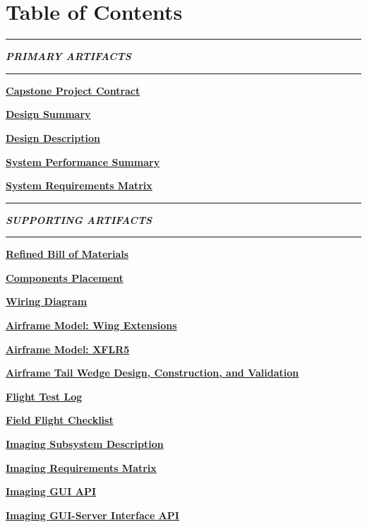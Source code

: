 \documentclass[]{article}
\newcommand{\pdflink}[2]{
\hyperlink{#1.1}{\textbf{#2}}
}
\begin{document}



\section*{Table of Contents}

\hrule

\textbf{\textit{PRIMARY ARTIFACTS}}

\hrule

\pdflink{proj_cont}{Capstone Project Contract}

\pdflink{des_sum}{Design Summary}

\pdflink{des_des}{Design Description}

\pdflink{sys_per}{System Performance Summary}

\pdflink{req_mat}{System Requirements Matrix}

\hrule

\textbf{\textit{SUPPORTING ARTIFACTS}}

\hrule

\pdflink{bil_mat}{Refined Bill of Materials}

\pdflink{com_pla}{Components Placement}

\pdflink{wd}{Wiring Diagram}

\pdflink{amwe}{Airframe Model: Wing Extensions}

\pdflink{amxflr}{Airframe Model: XFLR5}

\pdflink{atwt}{Airframe Tail Wedge Design, Construction, and Validation}

\pdflink{fl}{Flight Test Log}

\pdflink{ffcl}{Field Flight Checklist}

%
%
%
%
%
%
%
%

\pdflink{isd}{Imaging Subsystem Description}

\pdflink{irm}{Imaging Requirements Matrix}

\pdflink{iga}{Imaging GUI API}

\pdflink{igsia}{Imaging GUI-Server Interface API}
\end{document}
